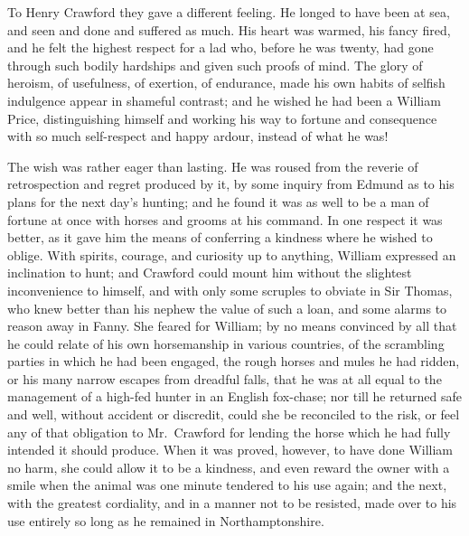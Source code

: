\documentclass{article}
\begin{document}
To Henry Crawford they gave a different feeling.  He longed
to have been at sea, and seen and done and suffered as much.
His heart was warmed, his fancy fired, and he felt
the highest respect for a lad who, before he was twenty,
had gone through such bodily hardships and given such
proofs of mind.  The glory of heroism, of usefulness,
of exertion, of endurance, made his own habits of selfish
indulgence appear in shameful contrast; and he wished
he had been a William Price, distinguishing himself and
working his way to fortune and consequence with so much
self-respect and happy ardour, instead of what he was!

The wish was rather eager than lasting.  He was roused from
the reverie of retrospection and regret produced by it,
by some inquiry from Edmund as to his plans for the next
day's hunting; and he found it was as well to be a man
of fortune at once with horses and grooms at his command.
In one respect it was better, as it gave him the means
of conferring a kindness where he wished to oblige.
With spirits, courage, and curiosity up to anything,
William expressed an inclination to hunt; and Crawford could
mount him without the slightest inconvenience to himself,
and with only some scruples to obviate in Sir Thomas,
who knew better than his nephew the value of such a loan,
and some alarms to reason away in Fanny.  She feared
for William; by no means convinced by all that he could
relate of his own horsemanship in various countries,
of the scrambling parties in which he had been engaged,
the rough horses and mules he had ridden, or his many narrow
escapes from dreadful falls, that he was at all equal to the
management of a high-fed hunter in an English fox-chase;
nor till he returned safe and well, without accident
or discredit, could she be reconciled to the risk,
or feel any of that obligation to Mr.\ Crawford for lending
the horse which he had fully intended it should produce.
When it was proved, however, to have done William no harm,
she could allow it to be a kindness, and even reward
the owner with a smile when the animal was one minute
tendered to his use again; and the next, with the
greatest cordiality, and in a manner not to be resisted,
made over to his use entirely so long as he remained
in Northamptonshire.

\end{document}
